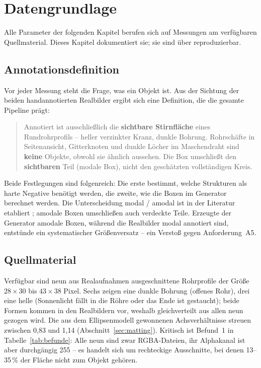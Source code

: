 \chapter{Datengrundlage}
\label{kap:daten}

Alle Parameter der folgenden Kapitel berufen sich auf Messungen am verfügbaren
Quellmaterial. Dieses Kapitel dokumentiert sie; sie sind über
 reproduzierbar.

\section{Annotationsdefinition}
\label{sec:annotation}

Vor jeder Messung steht die Frage, was ein Objekt ist. Aus der Sichtung der
beiden handannotierten Realbilder ergibt sich eine Definition, die die gesamte
Pipeline prägt:

\begin{quote}
Annotiert ist ausschließlich die \textbf{sichtbare Stirnfläche} eines
Rundrohrprofils -- heller verzinkter Kranz, dunkle Bohrung. Rohrschäfte in
Seitenansicht, Gitterknoten und dunkle Löcher im Maschendraht sind
\textbf{keine} Objekte, obwohl sie ähnlich aussehen. Die Box umschließt den
\textbf{sichtbaren} Teil (modale Box), nicht den geschätzten vollständigen Kreis.
\end{quote}

Beide Festlegungen sind folgenreich: Die erste bestimmt, welche Strukturen als
harte Negative benötigt werden, die zweite, wie die Boxen im Generator berechnet
werden. Die Unterscheidung modal / amodal ist in der Literatur etabliert
\parencite{li2016amodal,zhu2017amodal}; amodale Boxen umschließen auch verdeckte
Teile. Erzeugte der Generator amodale Boxen, während die Realbilder modal
annotiert sind, entstünde ein systematischer Größenversatz -- ein Verstoß gegen
Anforderung~A5.

\section{Quellmaterial}
\label{sec:quellmaterial}

 Verfügbar sind neun aus Realaufnahmen
ausgeschnittene Rohrprofile der Größe $28\times30$ bis $43\times38$ Pixel. Sechs
zeigen eine dunkle Bohrung (offenes Rohr), drei eine helle (Sonnenlicht fällt in
die Röhre oder das Ende ist gestaucht); beide Formen kommen in den Realbildern
vor, weshalb gleichverteilt aus allen neun gezogen wird. Die aus dem
Ellipsenmodell gewonnenen Achsverhältnisse streuen zwischen 0,83 und 1,14
(Abschnitt~\ref{sec:matting}). Kritisch ist Befund~1 in Tabelle~\ref{tab:befunde}: Alle neun sind zwar RGBA-Dateien, ihr Alphakanal ist
aber durchgängig 255 -- es handelt sich um rechteckige Ausschnitte, bei denen
13--35\,\% der Fläche nicht zum Objekt gehören.

